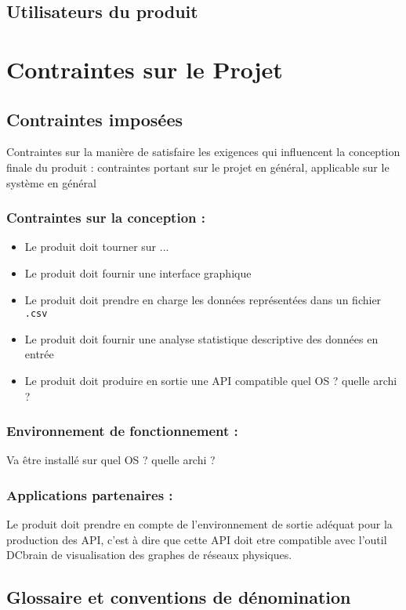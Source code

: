 		\subsection{Utilisateurs du produit}
		
	\section{Contraintes sur le Projet}
		\subsection{Contraintes imposées}
		{\color{red}Contraintes sur la manière de satisfaire les exigences qui influencent la conception finale du produit : contraintes portant sur le projet en général, applicable sur le système en général}
			\subsubsection{Contraintes sur la conception :} 
				\begin{itemize}
					\item Le produit doit tourner sur ...
					\item Le produit doit fournir une interface graphique
					\item Le produit doit prendre en charge les données représentées dans un fichier \lstinline!.csv!
					\item Le produit doit fournir une analyse statistique descriptive des données en entrée
					\item Le produit doit produire en sortie une API compatible
					quel OS ? quelle archi ?
				\end{itemize}
			\subsubsection{Environnement de fonctionnement :} Va être installé sur quel OS ? quelle archi ?
			\subsubsection{Applications partenaires :} 
			Le produit doit prendre en compte de l'environnement de sortie adéquat pour la production des API, c'est à dire que cette API doit etre compatible avec l'outil DCbrain de visualisation des graphes de réseaux physiques.
		
		\subsection{Glossaire et conventions de dénomination}
		

